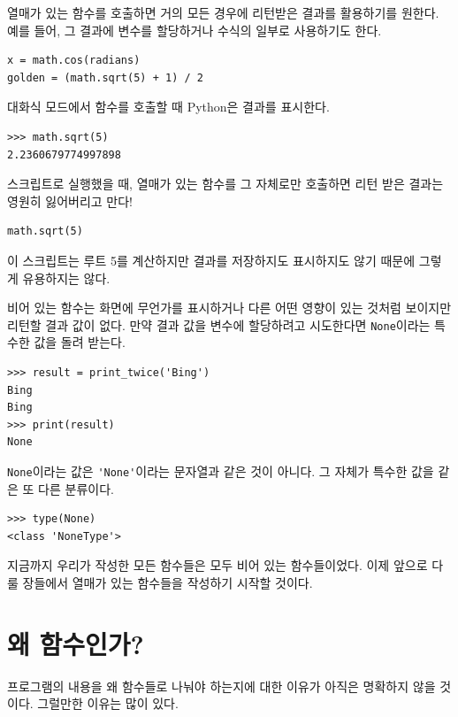 \documentclass[10pt]{book}
\begin{document}
열매가 있는 함수를 호출하면 거의 모든 경우에 리턴받은 결과를 활용하기를
원한다.  예를 들어, 그 결과에 변수를 할당하거나 수식의 일부로
사용하기도 한다.

\begin{verbatim}
x = math.cos(radians)
golden = (math.sqrt(5) + 1) / 2
\end{verbatim}
%
대화식 모드에서 함수를 호출할 때  Python은 결과를 표시한다. 

\begin{verbatim}
>>> math.sqrt(5)
2.2360679774997898
\end{verbatim}
%
스크립트로 실행했을 때, 열매가 있는 함수를 그 자체로만 호출하면 리턴 받은 결과는 영원히 잃어버리고 만다!

\begin{verbatim}
math.sqrt(5)
\end{verbatim}
%
이 스크립트는 루트 5를 계산하지만 결과를 저장하지도 표시하지도 않기
때문에 그렇게 유용하지는 않다.

비어 있는 함수는 화면에 무언가를 표시하거나 다른 어떤 영향이 있는
것처럼 보이지만 리턴할 결과 값이 없다.  만약 결과 값을 변수에
할당하려고 시도한다면 {\tt None}이라는 특수한 값을 돌려 받는다.

\begin{verbatim}
>>> result = print_twice('Bing')
Bing
Bing
>>> print(result)
None
\end{verbatim}
%
{\tt None}이라는 값은 \verb"'None'"이라는 문자열과 같은 것이 아니다.
그 자체가 특수한 값을 같은 또 다른 분류이다.

\begin{verbatim}
>>> type(None)
<class 'NoneType'>
\end{verbatim}
%
지금까지 우리가 작성한 모든 함수들은 모두 비어 있는 함수들이었다.  이제
앞으로 다룰 장들에서 열매가 있는 함수들을 작성하기 시작할 것이다.


\section{왜 함수인가?}

프로그램의 내용을 왜 함수들로 나눠야 하는지에 대한 이유가 아직은 명확하지 않을 것이다.  그럴만한 이유는 많이 있다. 
\end{document}
